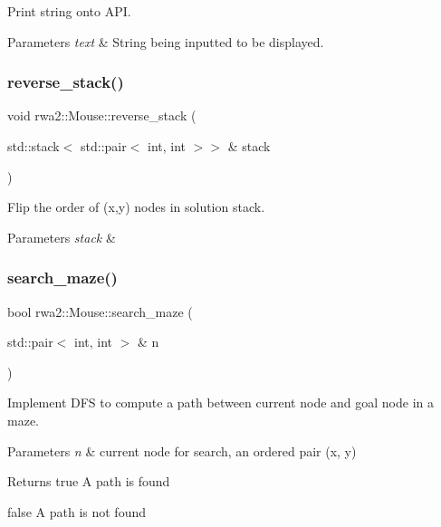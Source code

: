 Print string onto A\+PI. 


\begin{DoxyParams}{Parameters}
{\em text} & String being inputted to be displayed. \\
\hline
\end{DoxyParams}
\mbox{\label{classrwa2_1_1_mouse_a844c61c266db3edb980b9f6d30edaf6f}} 
\subsubsection{\texorpdfstring{reverse\+\_\+stack()}{reverse\_stack()}}
{\footnotesize\ttfamily void rwa2\+::\+Mouse\+::reverse\+\_\+stack (\begin{DoxyParamCaption}\item[{std\+::stack$<$ std\+::pair$<$ int, int $>$$>$ \&}]{stack }\end{DoxyParamCaption})}



Flip the order of (x,y) nodes in solution stack. 


\begin{DoxyParams}{Parameters}
{\em stack} & \\
\hline
\end{DoxyParams}
\mbox{\label{classrwa2_1_1_mouse_a66b3d6d831d814a569401158b07f9e83}} 
\subsubsection{\texorpdfstring{search\+\_\+maze()}{search\_maze()}}
{\footnotesize\ttfamily bool rwa2\+::\+Mouse\+::search\+\_\+maze (\begin{DoxyParamCaption}\item[{std\+::pair$<$ int, int $>$ \&}]{n }\end{DoxyParamCaption})}



Implement D\+FS to compute a path between current node and goal node in a maze. 


\begin{DoxyParams}{Parameters}
{\em n} & current node for search, an ordered pair (x, y)\\
\hline
\end{DoxyParams}
\begin{DoxyReturn}{Returns}
true A path is found 

false A path is not found 
\end{DoxyReturn}
\mbox{\label{classrwa2_1_1_mouse_aba15def87bc971a1b4f02252ab53c600}} 
